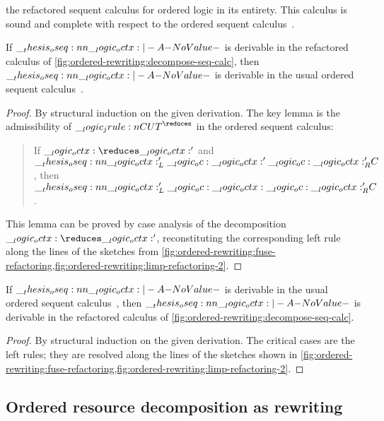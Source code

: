  the refactored sequent calculus for ordered logic in its entirety.
This calculus is sound and complete with respect to the ordered sequent calculus~.
%
\begin{theorem}[Soundness]
  If\/ $\oseq{\octx |- A}$ is derivable in the refactored calculus of \cref{fig:ordered-rewriting:decompose-seq-calc}, then $\oseq{\octx |- A}$ is derivable in the usual ordered sequent calculus~.
\end{theorem}
%
\begin{proof}
  By structural induction on the given derivation.
  The key lemma is the admissibility of $\jrule{CUT}^{\reduces}$ in the ordered sequent calculus:
  \begin{quotation}
    \normalsize If $\octx \reduces \octx'$ and $\oseq{\octx'_L \oc \octx' \oc \octx'_R |- C}$, then $\oseq{\octx'_L \oc \octx \oc \octx'_R |- C}$.
  \end{quotation}
  This lemma can be proved by case analysis of the decomposition $\octx \reduces \octx'$, reconstituting the corresponding left rule along the lines of the sketches from \cref{fig:ordered-rewriting:fuse-refactoring,fig:ordered-rewriting:limp-refactoring-2}.
\end{proof}
%
\begin{theorem}[Completeness]
  If\/ $\oseq{\octx |- A}$ is derivable in the usual ordered sequent calculus~, then $\oseq{\octx |- A}$ is derivable in the refactored calculus of \cref{fig:ordered-rewriting:decompose-seq-calc}.
\end{theorem}
%
\begin{proof}
  By structural induction on the given derivation.
  The critical cases are the left rules; they are resolved along the lines of the sketches shown in \cref{fig:ordered-rewriting:fuse-refactoring,fig:ordered-rewriting:limp-refactoring-2}.
\end{proof}

\subsection{Ordered resource decomposition as rewriting}


